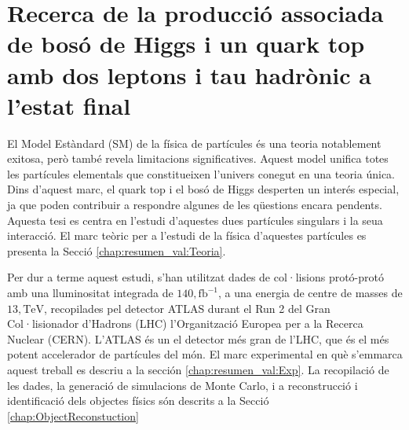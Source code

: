 
\lhead[{\bfseries \thepage}]{ \rightmark}

\label{partIII}


 \renewcommand\thesection{%
 \ifnum\value{alphasect}=1%
A%
 \else
\ifnum\value{alphasect}=2%
B%
\else
\ifnum\value{alphasect}=3%
C%
\else
\ifnum\value{alphasect}=4%
D%
\else
 \arabic{section}%
 \fi\fi\fi\fi}%

 \newenvironment{asection}{%
 \setcounter{alphasect}{1}%
 }{%
 \setcounter{alphasect}{0}%
 }%

 \newenvironment{bsection}{%
 \setcounter{alphasect}{2}%
 }{%
 \setcounter{alphasect}{0}%
 }%


\setcounter{section}{0}

\chapter*{Recerca de la producció associada de bosó de Higgs i un quark top amb dos leptons i tau hadrònic a l'estat final}
\label{chap:resumen_val}

El Model Estàndard (SM) de la física de partícules és una teoria notablement exitosa, 
però també revela limitacions significatives. Aquest model unifica totes les partícules 
elementals que constitueixen l'univers conegut en una teoria única. Dins d'aquest marc, 
el quark $\text{top}$ i el bosó de Higgs desperten un interés especial, ja que poden 
contribuir a respondre algunes de les qüestions encara pendents. Aquesta tesi es 
centra en l'estudi d'aquestes dues partícules singulars i la seua interacció. El
marc teòric per a l'estudi de la física d'aquestes partícules es presenta 
la Secció \ref{chap:resumen_val:Teoria}.

Per dur a terme aquest estudi, s'han utilitzat dades de col·lisions protó-protó amb una 
lluminositat integrada de $140,\text{fb}^{-1}$, a una energia de centre de masses de 
$13,\text{TeV}$, recopilades pel detector ATLAS durant el Run 2 del Gran Col·lisionador 
d'Hadrons (LHC) l'Organització Europea per a la Recerca Nuclear (CERN). L'ATLAS 
és un el detector més gran de l'LHC, que és el més potent accelerador de partícules del 
món. El marc experimental en què s'emmarca aquest treball es descriu a la sección 
\ref{chap:resumen_val:Exp}. La recopilació de les dades, la generació de simulacions 
de Monte Carlo, i a reconstrucció i identificació dels objectes físics són descrits a
la Secció \ref{chap:ObjectReconstuction}


